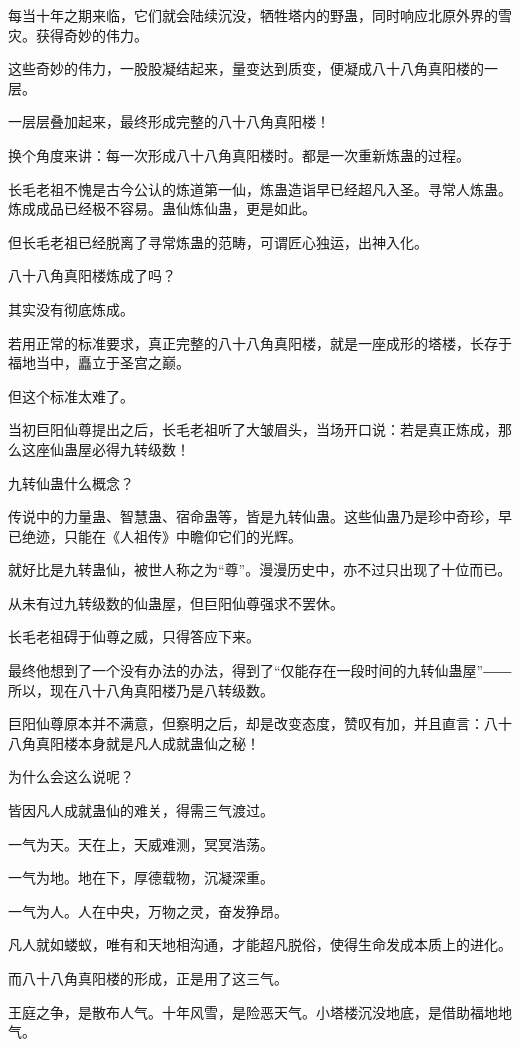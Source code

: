 \begin{this_body}
每当十年之期来临，它们就会陆续沉没，牺牲塔内的野蛊，同时响应北原外界的雪灾。获得奇妙的伟力。

这些奇妙的伟力，一股股凝结起来，量变达到质变，便凝成八十八角真阳楼的一层。

一层层叠加起来，最终形成完整的八十八角真阳楼！

换个角度来讲：每一次形成八十八角真阳楼时。都是一次重新炼蛊的过程。

长毛老祖不愧是古今公认的炼道第一仙，炼蛊造诣早已经超凡入圣。寻常人炼蛊。炼成成品已经极不容易。蛊仙炼仙蛊，更是如此。

但长毛老祖已经脱离了寻常炼蛊的范畴，可谓匠心独运，出神入化。

八十八角真阳楼炼成了吗？

其实没有彻底炼成。

若用正常的标准要求，真正完整的八十八角真阳楼，就是一座成形的塔楼，长存于福地当中，矗立于圣宫之巅。

但这个标准太难了。

当初巨阳仙尊提出之后，长毛老祖听了大皱眉头，当场开口说：若是真正炼成，那么这座仙蛊屋必得九转级数！

九转仙蛊什么概念？

传说中的力量蛊、智慧蛊、宿命蛊等，皆是九转仙蛊。这些仙蛊乃是珍中奇珍，早已绝迹，只能在《人祖传》中瞻仰它们的光辉。

就好比是九转蛊仙，被世人称之为“尊”。漫漫历史中，亦不过只出现了十位而已。

从未有过九转级数的仙蛊屋，但巨阳仙尊强求不罢休。

长毛老祖碍于仙尊之威，只得答应下来。

最终他想到了一个没有办法的办法，得到了“仅能存在一段时间的九转仙蛊屋”――所以，现在八十八角真阳楼乃是八转级数。

巨阳仙尊原本并不满意，但察明之后，却是改变态度，赞叹有加，并且直言：八十八角真阳楼本身就是凡人成就蛊仙之秘！

为什么会这么说呢？

皆因凡人成就蛊仙的难关，得需三气渡过。

一气为天。天在上，天威难测，冥冥浩荡。

一气为地。地在下，厚德载物，沉凝深重。

一气为人。人在中央，万物之灵，奋发狰昂。

凡人就如蝼蚁，唯有和天地相沟通，才能超凡脱俗，使得生命发成本质上的进化。

而八十八角真阳楼的形成，正是用了这三气。

王庭之争，是散布人气。十年风雪，是险恶天气。小塔楼沉没地底，是借助福地地气。


\end{this_body}
